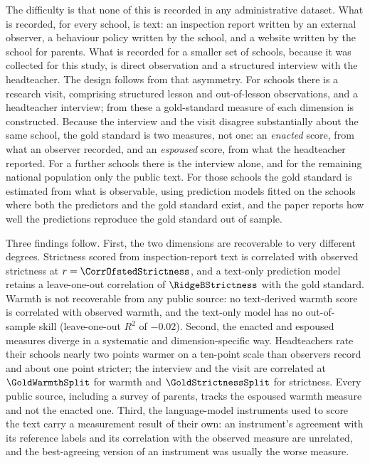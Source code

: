 The difficulty is that none of this is recorded in any administrative
dataset. What is recorded, for every school, is text: an inspection report
written by an external observer, a behaviour policy written by the school, and
a website written by the school for parents. What is recorded for a smaller
set of schools, because it was collected for this study, is direct observation
and a structured interview with the headteacher. The design follows from that
asymmetry. For \NTierOne{} schools there is a research visit, comprising
structured lesson and out-of-lesson observations, and a headteacher interview;
from these a gold-standard measure of each dimension is constructed. Because
the interview and the visit disagree substantially about the same school, the
gold standard is two measures, not one: an \emph{enacted} score, from what an
observer recorded, and an \emph{espoused} score, from what the headteacher
reported. For a further \NTierTwo{} schools there is the interview alone, and
for the remaining national population only the public text. For those schools
the gold standard is estimated from what is observable, using prediction
models fitted on the schools where both the predictors and the gold standard
exist, and the paper reports how well the predictions reproduce the gold
standard out of sample.

Three findings follow. First, the two dimensions are recoverable to very
different degrees. Strictness scored from inspection-report text is
correlated with observed strictness at $r = \CorrOfstedStrictness$, and a
text-only prediction model retains a leave-one-out correlation of
$\RidgeBStrictness$ with the gold standard. Warmth is not recoverable from
any public source: no text-derived warmth score is correlated with observed
warmth, and the text-only model has no out-of-sample skill (leave-one-out
$R^2$ of $-0.02$). Second, the enacted and espoused measures diverge in a
systematic and dimension-specific way. Headteachers rate their schools nearly
two points warmer on a ten-point scale than observers record and about one
point stricter; the interview and the visit are correlated at
$\GoldWarmthSplit$ for warmth and $\GoldStrictnessSplit$ for strictness.
Every public source, including a survey of parents, tracks the espoused warmth
measure and not the enacted one. Third, the language-model instruments used to
score the text carry a measurement result of their own: an instrument's
agreement with its reference labels and its correlation with the observed
measure are unrelated, and the best-agreeing version of an instrument was
usually the worse measure.

